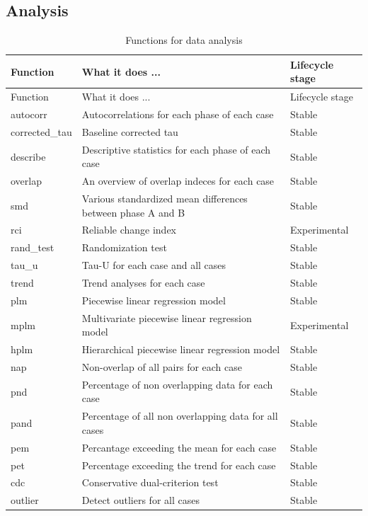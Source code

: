 \documentclass[
  letterpaper,
  DIV=11,
  numbers=noendperiod]{scrreprt}
\begin{document}
\hypertarget{analysis}{%
\subsection{Analysis}\label{analysis}}

\hypertarget{tbl-functions-analysis}{}
\begin{longtable}[]{@{}lll@{}}
\caption{\label{tbl-functions-analysis}Functions for data
analysis}\tabularnewline
\toprule()
Function & What it does ... & Lifecycle stage \\
\midrule()
\endfirsthead
\toprule()
Function & What it does ... & Lifecycle stage \\
\midrule()
\endhead
autocorr & Autocorrelations for each phase of each case & Stable \\
corrected\_tau & Baseline corrected tau & Stable \\
describe & Descriptive statistics for each phase of each case &
Stable \\
overlap & An overview of overlap indeces for each case & Stable \\
smd & Various standardized mean differences between phase A and B &
Stable \\
rci & Reliable change index & Experimental \\
rand\_test & Randomization test & Stable \\
tau\_u & Tau-U for each case and all cases & Stable \\
trend & Trend analyses for each case & Stable \\
plm & Piecewise linear regression model & Stable \\
mplm & Multivariate piecewise linear regression model & Experimental \\
hplm & Hierarchical piecewise linear regression model & Stable \\
nap & Non-overlap of all pairs for each case & Stable \\
pnd & Percentage of non overlapping data for each case & Stable \\
pand & Percentage of all non overlapping data for all cases & Stable \\
pem & Percantage exceeding the mean for each case & Stable \\
pet & Percentage exceeding the trend for each case & Stable \\
cdc & Conservative dual-criterion test & Stable \\
outlier & Detect outliers for all cases & Stable \\
\bottomrule()
\end{longtable}
\end{document}
